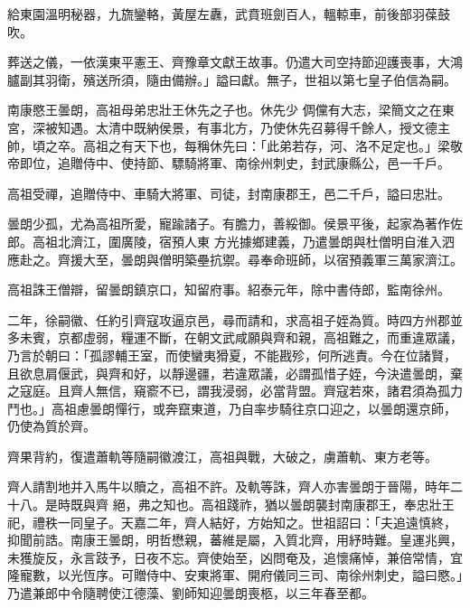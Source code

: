 \begin{pinyinscope}
 給東園溫明秘器，九旒鑾輅，黃屋左纛，武賁班劍百人，轀輬車，前後部羽葆鼓吹。



 葬送之儀，一依漢東平憲王、齊豫章文獻王故事。仍遣大司空持節迎護喪事，大鴻臚副其羽衛，殯送所須，隨由備辦。」謚曰獻。無子，世祖以第七皇子伯信為嗣。



 南康愍王曇朗，高祖母弟忠壯王休先之子也。休先少
 倜儻有大志，梁簡文之在東宮，深被知遇。太清中既納侯景，有事北方，乃使休先召募得千餘人，授文德主帥，頃之卒。高祖之有天下也，每稱休先曰：「此弟若存，河、洛不足定也。」梁敬帝即位，追贈侍中、使持節、驃騎將軍、南徐州刺史，封武康縣公，邑一千戶。



 高祖受禪，追贈侍中、車騎大將軍、司徒，封南康郡王，邑二千戶，謚曰忠壯。



 曇朗少孤，尤為高祖所愛，寵踰諸子。有膽力，善綏御。侯景平後，起家為著作佐郎。高祖北濟江，圍廣陵，宿預人東
 方光據鄉建義，乃遣曇朗與杜僧明自淮入泗應赴之。齊援大至，曇朗與僧明築壘抗禦。尋奉命班師，以宿預義軍三萬家濟江。



 高祖誅王僧辯，留曇朗鎮京口，知留府事。紹泰元年，除中書侍郎，監南徐州。



 二年，徐嗣徽、任約引齊寇攻逼京邑，尋而請和，求高祖子姪為質。時四方州郡並多未賓，京都虛弱，糧運不斷，在朝文武咸願與齊和親，高祖難之，而重違眾議，乃言於朝曰：「孤謬輔王室，而使蠻夷猾夏，不能戡殄，何所逃責。今在位諸賢，
 且欲息肩偃武，與齊和好，以靜邊疆，若違眾議，必謂孤惜子姪，今決遣曇朗，棄之寇庭。且齊人無信，窺窬不已，謂我浸弱，必當背盟。齊寇若來，諸君須為孤力鬥也。」高祖慮曇朗憚行，或奔竄東道，乃自率步騎往京口迎之，以曇朗還京師，仍使為質於齊。



 齊果背約，復遣蕭軌等隨嗣徽渡江，高祖與戰，大破之，虜蕭軌、東方老等。



 齊人請割地并入馬牛以贖之，高祖不許。及軌等誅，齊人亦害曇朗于晉陽，時年二十八。是時既與齊
 絕，弗之知也。高祖踐祚，猶以曇朗襲封南康郡王，奉忠壯王祀，禮秩一同皇子。天嘉二年，齊人結好，方始知之。世祖詔曰：「夫追遠慎終，抑聞前誥。南康王曇朗，明哲懋親，蕃維是屬，入質北齊，用紓時難。皇運兆興，未獲旋反，永言跂予，日夜不忘。齊使始至，凶問奄及，追懷痛悼，兼倍常情，宜隆寵數，以光恆序。可贈侍中、安東將軍、開府儀同三司、南徐州刺史，謚曰愍。」乃遣兼郎中令隨聘使江德藻、劉師知迎曇朗喪柩，以三年春至都。




\end{pinyinscope}
